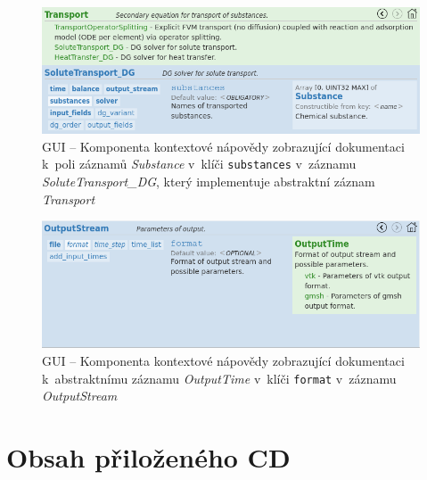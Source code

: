 \documentclass[FM,bw,DP]{tulthesis}
\begin{document}
\begin{figure}[h!]
	\centering
    \includegraphics[width=\textwidth]{../img/screenshots/gui_doc_substances.png}
    \caption[GUI -- Kontextová nápověda pro záznam \textit{SoluteTransport\_DG}]{GUI -- Komponenta kontextové nápovědy zobrazující dokumentaci k~poli záznamů \textit{Substance} v~klíči \texttt{substances} v~záznamu \textit{SoluteTransport\_DG}, který implementuje abstraktní záznam \textit{Transport}}
	\label{img:gui_doc_substances}
\end{figure}

\begin{figure}[h!]
	\centering
    \includegraphics[width=\textwidth]{../img/screenshots/gui_doc_format.png}
    \caption[GUI -- Kontextová nápověda pro záznam \textit{OutputStream}]{GUI -- Komponenta kontextové nápovědy zobrazující dokumentaci k~abstraktnímu záznamu \textit{OutputTime} v~klíči \texttt{format} v~záznamu \textit{OutputStream}}
	\label{img:gui_doc_format}
\end{figure}

\clearpage

\chapter{Obsah přiloženého CD}
\end{document}
